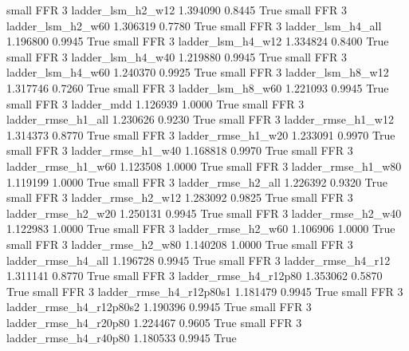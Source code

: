      small      FFR                 3        ladder_lsm_h2_w12   1.394090      0.8445    True
     small      FFR                 3        ladder_lsm_h2_w60   1.306319      0.7780    True
     small      FFR                 3        ladder_lsm_h4_all   1.196800      0.9945    True
     small      FFR                 3        ladder_lsm_h4_w12   1.334824      0.8400    True
     small      FFR                 3        ladder_lsm_h4_w40   1.219880      0.9945    True
     small      FFR                 3        ladder_lsm_h4_w60   1.240370      0.9925    True
     small      FFR                 3        ladder_lsm_h8_w12   1.317746      0.7260    True
     small      FFR                 3        ladder_lsm_h8_w60   1.221093      0.9945    True
     small      FFR                 3               ladder_mdd   1.126939      1.0000    True
     small      FFR                 3       ladder_rmse_h1_all   1.230626      0.9230    True
     small      FFR                 3       ladder_rmse_h1_w12   1.314373      0.8770    True
     small      FFR                 3       ladder_rmse_h1_w20   1.233091      0.9970    True
     small      FFR                 3       ladder_rmse_h1_w40   1.168818      0.9970    True
     small      FFR                 3       ladder_rmse_h1_w60   1.123508      1.0000    True
     small      FFR                 3       ladder_rmse_h1_w80   1.119199      1.0000    True
     small      FFR                 3       ladder_rmse_h2_all   1.226392      0.9320    True
     small      FFR                 3       ladder_rmse_h2_w12   1.283092      0.9825    True
     small      FFR                 3       ladder_rmse_h2_w20   1.250131      0.9945    True
     small      FFR                 3       ladder_rmse_h2_w40   1.122983      1.0000    True
     small      FFR                 3       ladder_rmse_h2_w60   1.106906      1.0000    True
     small      FFR                 3       ladder_rmse_h2_w80   1.140208      1.0000    True
     small      FFR                 3       ladder_rmse_h4_all   1.196728      0.9945    True
     small      FFR                 3       ladder_rmse_h4_r12   1.311141      0.8770    True
     small      FFR                 3    ladder_rmse_h4_r12p80   1.353062      0.5870    True
     small      FFR                 3  ladder_rmse_h4_r12p80s1   1.181479      0.9945    True
     small      FFR                 3  ladder_rmse_h4_r12p80s2   1.190396      0.9945    True
     small      FFR                 3    ladder_rmse_h4_r20p80   1.224467      0.9605    True
     small      FFR                 3    ladder_rmse_h4_r40p80   1.180533      0.9945    True
